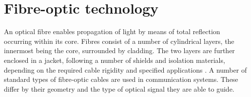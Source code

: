 \documentclass{standalone}
\begin{document}
\chapter{Fibre-optic technology} \label{ch:fibres}
\setcounter{page}\thestranica


An optical fibre enables propagation of light by means of total reflection occurring within its core. Fibres consist of a number of cylindrical layers, the innermost being the core, surrounded by cladding. The two layers are further enclosed in a jacket, following a number of shields and isolation materials, depending on the required cable rigidity and specified applications \cite{fer:oks}. A number of standard types of fibre-optic cables are used in communication systems. These differ by their geometry and the type of optical signal they are able to guide. \\
\end{document}
